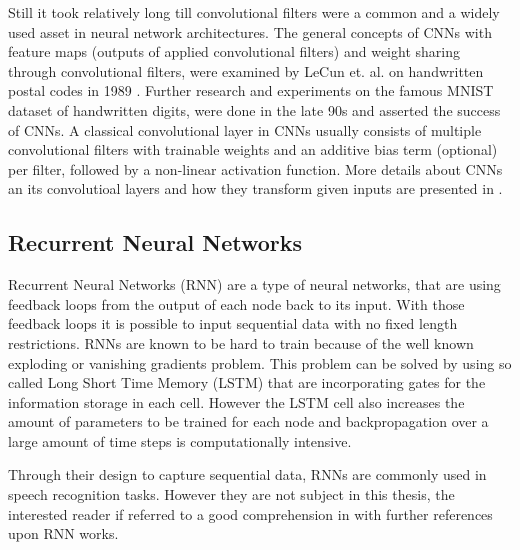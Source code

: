 Still it took relatively long till convolutional filters were a common and a widely used asset in neural network architectures.
The general concepts of CNNs with feature maps (outputs of applied convolutional filters) and weight sharing through convolutional filters, were examined by LeCun et. al. on handwritten postal codes in 1989 \cite{LeCun1989_Generalization}.
Further research and experiments on the famous MNIST dataset of handwritten digits, were done in the late 90s \cite{LeCun1998} and asserted the success of CNNs.
A classical convolutional layer in CNNs usually consists of multiple convolutional filters with trainable weights and an additive bias term (optional) per filter, followed by a non-linear activation function.
More details about CNNs an its convolutioal layers and how they transform given inputs are presented in .




\subsection{Recurrent Neural Networks}\label{sec:prev_nn_rnn}
Recurrent Neural Networks (RNN) are a type of neural networks, that are using feedback loops from the output of each node back to its input.
With those feedback loops it is possible to input sequential data with no fixed length restrictions.
RNNs are known to be hard to train because of the well known exploding or vanishing gradients problem.
This problem can be solved by using so called Long Short Time Memory (LSTM) that are incorporating gates for the information storage in each cell. 
However the LSTM cell also increases the amount of parameters to be trained for each node and backpropagation over a large amount of time steps is computationally intensive.

Through their design to capture sequential data, RNNs are commonly used in speech recognition tasks.
However they are not subject in this thesis, the interested reader if referred to a good comprehension in \cite{Staudenmeyer2019} with further references upon RNN works.



